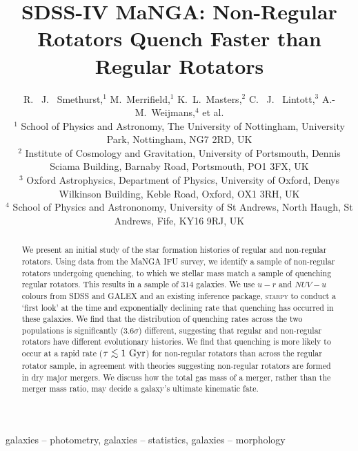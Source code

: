 \documentclass[useAMS,usenatbib]{mn2e}
\def\lesssim{\mathrel{\hbox{\rlap{\hbox{\lower3pt\hbox{$\sim$}}}\hbox{\raise2pt\hbox{$<$}}}}}
\begin{document}
\title[Quenching Histories of Regular and Non-Regular Rotators]{SDSS-IV MaNGA: Non-Regular Rotators Quench Faster than Regular Rotators}
\author[Smethurst et al. 2017]{R. ~J. ~Smethurst,$^{1}$ M.~Merrifield,$^{1}$ K.~L.~Masters,$^{2}$  C. ~J. ~Lintott,$^{3}$ \newauthor A.-M.~Weijmans,$^{4}$ et al.
\\ $^1$ School of Physics and Astronomy, The University of Nottingham, University Park, Nottingham, NG7 2RD, UK
\\ $^2$ Institute of Cosmology and Gravitation, University of Portsmouth, Dennis Sciama Building, Barnaby Road, Portsmouth, PO1 3FX, UK 
\\ $^3$ Oxford Astrophysics, Department of Physics, University of Oxford, Denys Wilkinson Building, Keble Road, Oxford, OX1 3RH, UK
\\ $^4$ School of Physics and Astrononomy, University of St Andrews, North Haugh, St Andrews, Fife, KY16 9RJ, UK
}

\maketitle

\begin{abstract}
We present an initial study of the star formation histories of regular and non-regular rotators. Using data from the MaNGA IFU survey, we identify a sample of non-regular rotators undergoing quenching, to which we stellar mass match a sample of quenching regular rotators. This results in a sample of $314$ galaxies. We use $u-r$ and $NUV-u$ colours from SDSS and GALEX and an existing inference package, \textsc{starpy} to conduct a `first look' at the time and exponentially declining rate that quenching has occurred in these galaxies. We find that the distribution of quenching rates across the two populations is significantly ($3.6\sigma$) different, suggesting that regular and non-regular rotators have different evolutionary histories. We find that quenching is more likely to occur at a rapid rate ($\tau \lesssim 1~\rm{Gyr}$) for non-regular rotators than across the regular rotator sample, in agreement with theories suggesting non-regular rotators are formed in dry major mergers.  We discuss how the total gas mass of a merger, rather than the merger mass ratio, may decide a galaxy's ultimate kinematic fate. 
\end{abstract}

\begin{keywords}
galaxies -- photometry, galaxies -- statistics, galaxies -- morphology
\end{keywords}
\end{document}
